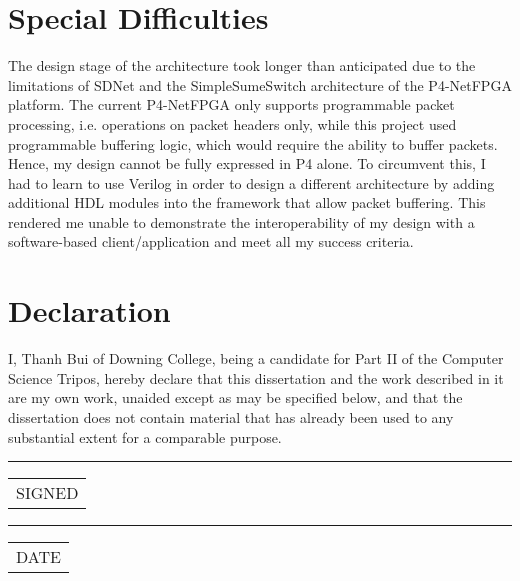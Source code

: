 \section*{Special Difficulties}
The design stage of the architecture took longer than anticipated due to the limitations of SDNet and the SimpleSumeSwitch architecture of the P4-NetFPGA platform. The current P4-NetFPGA only supports programmable packet processing, i.e. operations on packet headers only, while this project used programmable buffering logic, which would require the ability to buffer packets. Hence, my design cannot be fully expressed in P4 alone. To circumvent this, I had to learn to use Verilog in order to design a different architecture by adding additional HDL modules into the framework that allow packet buffering. This rendered me unable to demonstrate the interoperability of my design with a software-based client/application and meet all my success criteria.


\newpage
\section*{Declaration}

I, Thanh Bui of Downing College, being a candidate for Part II of the Computer Science Tripos, hereby declare that this dissertation and the work described in it are my own work, unaided except as may be specified below, and that the dissertation does not contain material that has already been used to any substantial extent for a comparable purpose.

\begin{minipage}[t]{0.4\textwidth}
	\vspace*{1.5cm}  %
	\hrule
	\vspace{1mm} %
	\begin{tabular}[t]{l}
		SIGNED
	\end{tabular}
\end{minipage} 
\hspace{2cm}
\begin{minipage}[t]{0.4\textwidth}
	\vspace*{1.5cm}  %
	\hrule
	\vspace{1mm} %
	\begin{tabular}[t]{l}
		DATE
	\end{tabular}
\end{minipage}